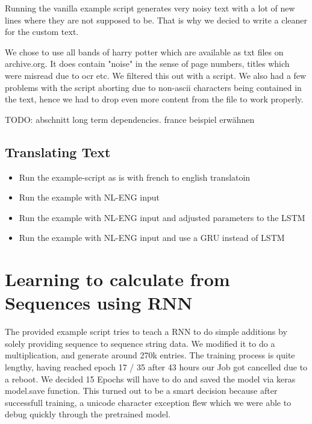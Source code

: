 \documentclass{article}
\begin{document}
Running the vanilla example script generates very noisy text with a lot of new lines where they are not supposed to be. That is why we decied to write a cleaner for the custom text.

We chose to use all bands of harry potter which are available as txt files on archive.org.
It does contain "noise" in the sense of page numbers, titles which were misread due to ocr etc. We filtered this out with a script.
We also had a few problems with the script aborting due to non-ascii characters being contained in the text, hence we had to drop even more content from the file to work properly.

TODO: abschnitt long term dependencies. france beispiel erwähnen

\subsection{Translating Text}
\label{sec:trans}
\begin{itemize}
\item{Run the example-script as is with french to english translatoin}
\item{Run the example with NL-ENG input}
\item{Run the example with NL-ENG input and adjusted parameters to the LSTM}
\item{Run the example with NL-ENG input and use a GRU instead of LSTM}
\end{itemize}

\section{Learning to calculate from Sequences using RNN}
\label{sec:rnn}


The provided example script tries to teach a RNN to do simple additions by solely providing sequence to sequence string data.
We modified it to do a multiplication, and generate around 270k entries. The training process is quite lengthy, having reached epoch 17 / 35 after 43 hours our Job got cancelled due to a reboot.
We decided 15 Epochs will have to do and saved the model via keras model.save function. This turned out to be a smart decision because after successfull training, a unicode character exception flew which we were able to debug quickly through the pretrained model.
\end{document}
